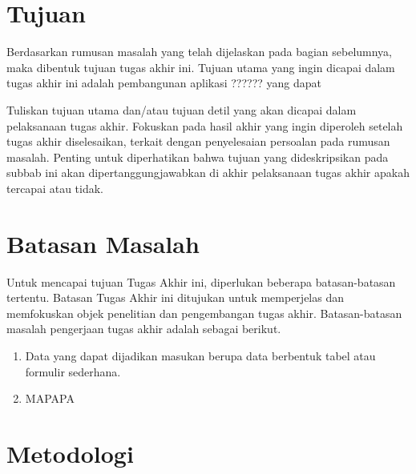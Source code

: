 \section{Tujuan}

Berdasarkan rumusan masalah yang telah dijelaskan pada bagian sebelumnya, maka dibentuk tujuan tugas akhir ini. Tujuan utama yang ingin dicapai dalam tugas akhir ini adalah pembangunan aplikasi ?????? yang dapat 

Tuliskan tujuan utama dan/atau tujuan detil yang akan dicapai dalam pelaksanaan tugas akhir. Fokuskan pada hasil akhir yang ingin diperoleh setelah tugas akhir diselesaikan, terkait dengan penyelesaian persoalan pada rumusan masalah. Penting untuk diperhatikan bahwa tujuan yang dideskripsikan pada subbab ini akan dipertanggungjawabkan di akhir pelaksanaan tugas akhir apakah tercapai atau tidak.

\section{Batasan Masalah}

Untuk mencapai tujuan Tugas Akhir ini, diperlukan beberapa batasan-batasan tertentu. Batasan Tugas Akhir ini ditujukan untuk memperjelas dan memfokuskan objek penelitian dan pengembangan tugas akhir. Batasan-batasan masalah pengerjaan tugas akhir adalah sebagai berikut.

\begin{enumerate}
    \item Data yang dapat dijadikan masukan berupa data berbentuk tabel atau formulir sederhana.
    \item MAPAPA
\end{enumerate}

\section{Metodologi}

